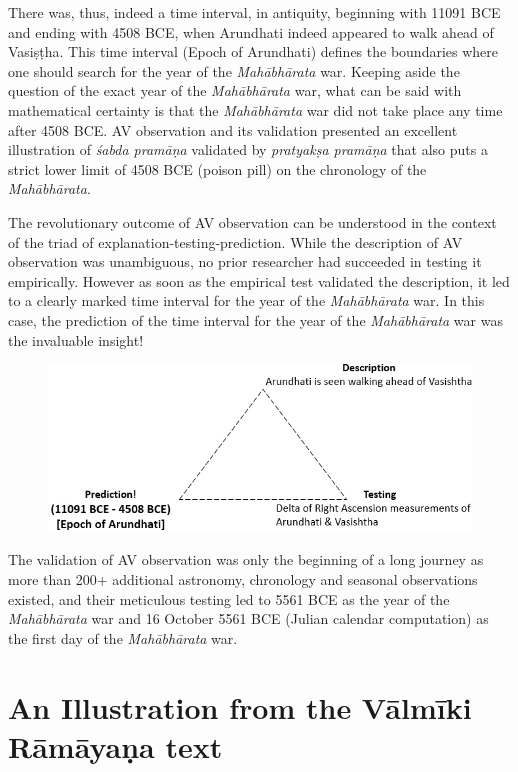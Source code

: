 There was, thus, indeed a time interval, in antiquity, beginning with 11091 BCE and ending with 4508 BCE, when Arundhati indeed appeared to walk ahead of Vasiṣṭha. This time interval (Epoch of Arundhati) defines the boundaries where one should search for the year of the \textit{Mahābhārata} war. Keeping aside the question of the exact year of the \textit{Mahābhārata} war, what can be said with mathematical certainty is that the \textit{Mahābhārata} war did not take place any time after 4508 BCE. AV observation and its validation presented an excellent illustration of \textit{śabda pramāṇa} validated by \textit{pratyakṣa pramāṇa} that also puts a strict lower limit of 4508 BCE (poison pill) on the chronology of the \textit{Mahābhārata}.

The revolutionary outcome of AV observation can be understood in the context of the triad of explanation-testing-prediction. While the description of AV observation was unambiguous, no prior researcher had succeeded in testing it empirically. However as soon as the empirical test validated the description, it led to a clearly marked time interval for the year of the \textit{Mahābhārata} war. In this case, the prediction of the time interval for the year of the \textit{Mahābhārata} war was the invaluable insight!

\begin{figure}[!h]
\includegraphics[scale=.38]{images/chap2-9.jpg}
\end{figure}

The validation of AV observation was only the beginning of a long journey as more than 200+ additional astronomy, chronology and seasonal observations existed, and their meticulous testing led to 5561 BCE as the year of the \textit{Mahābhārata} war and 16 October 5561 BCE (Julian calendar computation) as the first day of the \textit{Mahābhārata} war.

\vspace{-.3cm}

\section*{An Illustration from the Vālmīki Rāmāyaṇa text}

